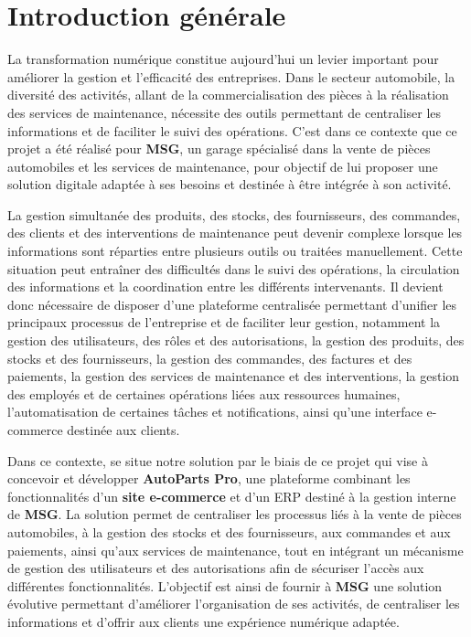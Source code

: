 \chapter*{Introduction générale}

La transformation numérique constitue aujourd'hui un levier important pour améliorer la gestion et l'efficacité des entreprises. Dans le secteur automobile, la diversité des activités, allant de la commercialisation des pièces à la réalisation des services de maintenance, nécessite des outils permettant de centraliser les informations et de faciliter le suivi des opérations. C'est dans ce contexte que ce projet a été réalisé pour \textbf{MSG}, un garage spécialisé dans la vente de pièces automobiles et les services de maintenance, pour objectif de lui proposer une solution digitale adaptée à ses besoins et destinée à être intégrée à son activité.

La gestion simultanée des produits, des stocks, des fournisseurs, des commandes, des clients et des interventions de maintenance peut devenir complexe lorsque les informations sont réparties entre plusieurs outils ou traitées manuellement. Cette situation peut entraîner des difficultés dans le suivi des opérations, la circulation des informations et la coordination entre les différents intervenants. Il devient donc nécessaire de disposer d'une plateforme centralisée permettant d'unifier les principaux processus de l'entreprise et de faciliter leur gestion, notamment la gestion des utilisateurs, des rôles et des autorisations, la gestion des produits, des stocks et des fournisseurs, la gestion des commandes, des factures et des paiements, la gestion des services de maintenance et des interventions, la gestion des employés et de certaines opérations liées aux ressources humaines, l'automatisation de certaines tâches et notifications, ainsi qu'une interface e-commerce destinée aux clients.

Dans ce contexte, se situe notre solution par le biais de ce projet qui vise à concevoir et développer \textbf{AutoParts Pro}, une plateforme combinant les fonctionnalités d'un \textbf{site e-commerce} et d'un \ac{ERP} destiné à la gestion interne de \textbf{MSG}. La solution permet de centraliser les processus liés à la vente de pièces automobiles, à la gestion des stocks et des fournisseurs, aux commandes et aux paiements, ainsi qu'aux services de maintenance, tout en intégrant un mécanisme de gestion des utilisateurs et des autorisations afin de sécuriser l'accès aux différentes fonctionnalités. L'objectif est ainsi de fournir à \textbf{MSG} une solution évolutive permettant d'améliorer l'organisation de ses activités, de centraliser les informations et d'offrir aux clients une expérience numérique adaptée.

